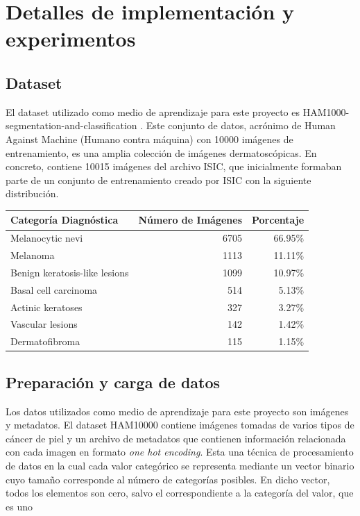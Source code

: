 \chapter{Detalles de implementación y experimentos}\label{chapter:implementation}

\section{Dataset}

El dataset utilizado como medio de aprendizaje para este proyecto es HAM1000-segmentation-and-classification . Este conjunto de datos, acrónimo de Human Against Machine (Humano contra máquina) con 10000 imágenes de entrenamiento, es una amplia colección de imágenes dermatoscópicas. En concreto, contiene 10015 imágenes del archivo ISIC, que inicialmente formaban parte de un conjunto de entrenamiento creado por ISIC  con la siguiente distribución.


\begin{tabular}{lrr}
   \hline
   \textbf{Categoría Diagnóstica} & \textbf{Número de Imágenes} & \textbf{Porcentaje} \\
   \hline
   Melanocytic nevi               & 6705                        & 66.95\%             \\
   Melanoma                       & 1113                        & 11.11\%             \\
   Benign keratosis-like lesions  & 1099                        & 10.97\%             \\
   Basal cell carcinoma           & 514                         & 5.13\%              \\
   Actinic keratoses              & 327                         & 3.27\%              \\
   Vascular lesions               & 142                         & 1.42\%              \\
   Dermatofibroma                 & 115                         & 1.15\%              \\
   \hline
   \end{tabular}

\section{Preparación y carga de datos}

Los datos utilizados como medio de aprendizaje para este proyecto son imágenes y metadatos. El dataset HAM10000 contiene imágenes tomadas de varios tipos de cáncer de piel y un archivo de metadatos que contienen información relacionada con cada imagen en formato \textit{one hot encoding}. Esta una técnica de procesamiento de datos en la cual cada valor categórico se representa mediante un vector binario cuyo tamaño corresponde al número de categorías posibles. En dicho vector, todos los elementos son cero, salvo el correspondiente a la categoría del valor, que es uno 

